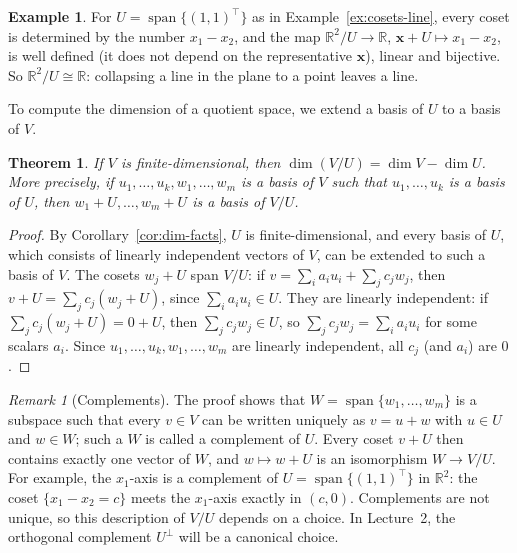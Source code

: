 \documentclass[11pt]{article}
\theoremstyle{definition}
\newtheorem{example}[definition]{Example}
\theoremstyle{plain}
\newtheorem{theorem}[definition]{Theorem}
\theoremstyle{remark}
\newtheorem{remark}[definition]{Remark}
\DeclareMathOperator{\Span}{span}
\begin{document}
\begin{example}
    For $U = \Span\{(1, 1)^\top\}$ as in Example~\ref{ex:cosets-line}, every coset is determined by the number $x_1 - x_2$, and the map $\mathbb{R}^2/U \to \mathbb{R}$, $\mathbf{x} + U \mapsto x_1 - x_2$, is well defined (it does not depend on the representative $\mathbf{x}$), linear and bijective. So $\mathbb{R}^2/U \cong \mathbb{R}$: collapsing a line in the plane to a point leaves a line.
\end{example}

To compute the dimension of a quotient space, we extend a basis of $U$ to a basis of $V$.

\begin{theorem}\label{thm:quotient-dim}
    If $V$ is finite-dimensional, then $\dim(V/U) = \dim V - \dim U$. More precisely, if $u_1, \ldots, u_k, w_1, \ldots, w_m$ is a basis of $V$ such that $u_1, \ldots, u_k$ is a basis of $U$, then $w_1 + U, \ldots, w_m + U$ is a basis of $V/U$.
\end{theorem}

\begin{proof}
    By Corollary~\ref{cor:dim-facts}, $U$ is finite-dimensional, and every basis of $U$, which consists of linearly independent vectors of $V$, can be extended to such a basis of $V$. The cosets $w_j + U$ span $V/U$: if $v = \sum_i a_i u_i + \sum_j c_j w_j$, then $v + U = \sum_j c_j (w_j + U)$, since $\sum_i a_i u_i \in U$. They are linearly independent: if $\sum_j c_j (w_j + U) = 0 + U$, then $\sum_j c_j w_j \in U$, so $\sum_j c_j w_j = \sum_i a_i u_i$ for some scalars $a_i$. Since $u_1, \ldots, u_k, w_1, \ldots, w_m$ are linearly independent, all $c_j$ (and $a_i$) are $0$.
\end{proof}

\begin{remark}[Complements]
    The proof shows that $W = \Span\{w_1, \ldots, w_m\}$ is a subspace such that every $v \in V$ can be written uniquely as $v = u + w$ with $u \in U$ and $w \in W$; such a $W$ is called a complement of $U$. Every coset $v + U$ then contains exactly one vector of $W$, and $w \mapsto w + U$ is an isomorphism $W \to V/U$. For example, the $x_1$-axis is a complement of $U = \Span\{(1, 1)^\top\}$ in $\mathbb{R}^2$: the coset $\{x_1 - x_2 = c\}$ meets the $x_1$-axis exactly in $(c, 0)$. Complements are not unique, so this description of $V/U$ depends on a choice. In Lecture~2, the orthogonal complement $U^\perp$ will be a canonical choice.
\end{remark}
\end{document}
